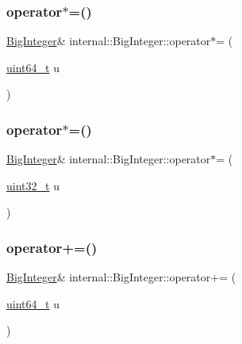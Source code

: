 \subsubsection{\texorpdfstring{operator$\ast$=()}{operator*=()}\hspace{0.1cm}{\footnotesize\ttfamily [1/2]}}
{\footnotesize\ttfamily \hyperlink{classinternal_1_1BigInteger}{Big\+Integer}\& internal\+::\+Big\+Integer\+::operator$\ast$= (\begin{DoxyParamCaption}\item[{\hyperlink{stdint_8h_aec6fcb673ff035718c238c8c9d544c47}{uint64\+\_\+t}}]{u }\end{DoxyParamCaption})\hspace{0.3cm}{\ttfamily [inline]}}

\mbox{\label{classinternal_1_1BigInteger_a83e8e464b7bc31c8b2c943f8563b2226}} 
\subsubsection{\texorpdfstring{operator$\ast$=()}{operator*=()}\hspace{0.1cm}{\footnotesize\ttfamily [2/2]}}
{\footnotesize\ttfamily \hyperlink{classinternal_1_1BigInteger}{Big\+Integer}\& internal\+::\+Big\+Integer\+::operator$\ast$= (\begin{DoxyParamCaption}\item[{\hyperlink{stdint_8h_a435d1572bf3f880d55459d9805097f62}{uint32\+\_\+t}}]{u }\end{DoxyParamCaption})\hspace{0.3cm}{\ttfamily [inline]}}

\mbox{\label{classinternal_1_1BigInteger_a09af1d6658d51ad4372649ce1c9c1a62}} 
\subsubsection{\texorpdfstring{operator+=()}{operator+=()}}
{\footnotesize\ttfamily \hyperlink{classinternal_1_1BigInteger}{Big\+Integer}\& internal\+::\+Big\+Integer\+::operator+= (\begin{DoxyParamCaption}\item[{\hyperlink{stdint_8h_aec6fcb673ff035718c238c8c9d544c47}{uint64\+\_\+t}}]{u }\end{DoxyParamCaption})\hspace{0.3cm}{\ttfamily [inline]}}

